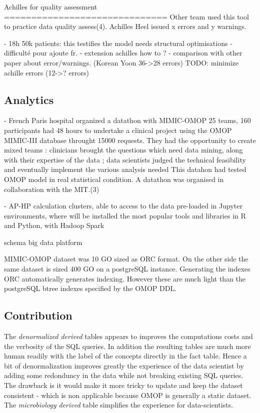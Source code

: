 Achilles for quality assessment
==============================
Other team used this tool to practice data quality assess(4).
Achilles Heel issued x errors and y warnings.

- 18h 50k patients: this testifies the model needs structural optimisations
- difficulté pour ajoute fr. 
- extension achilles how to ?
- comparison with other paper about error/warnings. (Korean Yoon 36->28 errors)
TODO: minimize achille errors  (12->? errors)
\subsection{Analytics}

- French Paris hospital organized a datathon with MIMIC-OMOP
25 teams, 160 participants had 48 hours to undertake a clinical project using the OMOP MIMIC-III database throught 15000 requests. They had the opportunity to create mixed teams : clinicians brought the questions which need data mining, along with their expertise of the data ; data scientists judged the technical feasibility and eventually implement the various analysis needed
This datahon had tested OMOP model in real statistical condition. A datathon was organised in collaboration with the MIT.(3)

- AP-HP calculation clusters, able to access to the data pre-loaded in Jupyter environments, where will be installed the most popular tools and libraries in R and Python, with Hadoop Spark

schema big data platform

MIMIC-OMOP dataset was 10 GO sized as ORC format. On the other side the same
dataset is sized 400 GO on a postgreSQL instance. Generating the indexes
ORC automatically generates indexing. However these are much light than the
postgreSQL btree indexes specified by the OMOP DDL.

\subsection{Contribution}

The \emph{denormalized derived} tables appears to improves the computations
costs and the verbosity of the SQL queries. In addition the resulting tables
are much more human readily with the label of the concepts directly in the fact
table. Hence a bit of denormalization improves greatly the experience of the
data scientist by adding some redonduncy in the data while not breaking
existing SQL queries. The drawback is it would make it more tricky to update
and keep the dataset consistent - which is non applicable because OMOP is
generally a static dataset.
The \emph{microbiology derived} table simplifies the experience for
data-scientists.

